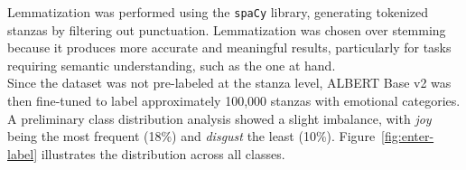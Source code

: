 Lemmatization was performed using the \texttt{spaCy} library, generating
tokenized stanzas by filtering out punctuation. Lemmatization was chosen over stemming because it produces
more accurate and meaningful results, particularly for tasks requiring semantic
understanding, such as the one at hand.\\

Since the dataset was not pre-labeled at the stanza level, ALBERT Base v2 was then fine-tuned to label approximately 100,000 stanzas with emotional categories.
A preliminary class distribution analysis showed a slight imbalance, with
\textit{joy} being the most frequent (18\%) and \textit{disgust} the least (10\%).
Figure~\ref{fig:enter-label} illustrates the distribution across all classes.





